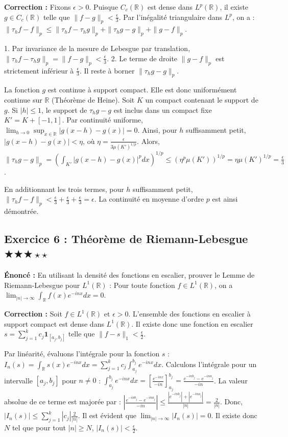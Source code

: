 \documentclass[11pt,a4paper]{article}
\begin{document}
\textbf{Correction :}
Fixons $\epsilon > 0$.
Puisque $C_c(\mathbb{R})$ est dense dans $L^p(\mathbb{R})$, il existe $g \in C_c(\mathbb{R})$ telle que $\| f - g \|_p < \frac{\epsilon}{3}$.
Par l'inégalité triangulaire dans $L^p$, on a :
$\| \tau_h f - f \|_p \le \| \tau_h f - \tau_h g \|_p + \| \tau_h g - g \|_p + \| g - f \|_p$.

1. Par invariance de la mesure de Lebesgue par translation, $\| \tau_h f - \tau_h g \|_p = \| f - g \|_p < \frac{\epsilon}{3}$.
2. Le terme de droite $\| g - f \|_p$ est strictement inférieur à $\frac{\epsilon}{3}$.
Il reste à borner $\| \tau_h g - g \|_p$.

La fonction $g$ est continue à support compact. Elle est donc uniformément continue sur $\mathbb{R}$ (Théorème de Heine).
Soit $K$ un compact contenant le support de $g$. Si $|h| \le 1$, le support de $\tau_h g - g$ est inclus dans un compact fixe $K' = K + [-1, 1]$.
Par continuité uniforme, $\lim_{h \to 0} \sup_{x \in \mathbb{R}} |g(x-h) - g(x)| = 0$.
Ainsi, pour $h$ suffisamment petit, $|g(x-h) - g(x)| < \eta$, où $\eta = \frac{\epsilon}{3 \mu(K')^{1/p}}$.
Alors,
$\| \tau_h g - g \|_p = \left( \int_{K'} |g(x-h) - g(x)|^p dx \right)^{1/p} \le \left( \eta^p \mu(K') \right)^{1/p} = \eta \mu(K')^{1/p} = \frac{\epsilon}{3}$.

En additionnant les trois termes, pour $h$ suffisamment petit,
$\| \tau_h f - f \|_p < \frac{\epsilon}{3} + \frac{\epsilon}{3} + \frac{\epsilon}{3} = \epsilon$.
La continuité en moyenne d'ordre $p$ est ainsi démontrée.


\subsection*{Exercice 6 : Théorème de Riemann-Lebesgue \quad $\bigstar\bigstar\bigstar\star\star$}

\textbf{Énoncé :}
En utilisant la densité des fonctions en escalier, prouver le Lemme de Riemann-Lebesgue pour $L^1(\mathbb{R})$ :
Pour toute fonction $f \in L^1(\mathbb{R})$, on a $\lim_{|n| \to \infty} \int_{\mathbb{R}} f(x) e^{-inx} dx = 0$.

\textbf{Correction :}
Soit $f \in L^1(\mathbb{R})$ et $\epsilon > 0$.
L'ensemble des fonctions en escalier à support compact est dense dans $L^1(\mathbb{R})$.
Il existe donc une fonction en escalier $s = \sum_{j=1}^k c_j \mathbf{1}_{[a_j, b_j]}$ telle que $\| f - s \|_1 < \frac{\epsilon}{2}$.

Par linéarité, évaluons l'intégrale pour la fonction $s$ :
$I_n(s) = \int_{\mathbb{R}} s(x) e^{-inx} dx = \sum_{j=1}^k c_j \int_{a_j}^{b_j} e^{-inx} dx$.
Calculons l'intégrale pour un intervalle $[a_j, b_j]$ pour $n \neq 0$ :
$\int_{a_j}^{b_j} e^{-inx} dx = \left[ \frac{e^{-inx}}{-in} \right]_{a_j}^{b_j} = \frac{e^{-inb_j} - e^{-ina_j}}{-in}$.
La valeur absolue de ce terme est majorée par :
$\left| \frac{e^{-inb_j} - e^{-ina_j}}{-in} \right| \le \frac{|e^{-inb_j}| + |e^{-ina_j}|}{|n|} = \frac{2}{|n|}$.
Donc, $|I_n(s)| \le \sum_{j=1}^k |c_j| \frac{2}{|n|}$.
Il est évident que $\lim_{|n| \to \infty} |I_n(s)| = 0$. Il existe donc $N$ tel que pour tout $|n| \ge N$, $|I_n(s)| < \frac{\epsilon}{2}$.
\end{document}
